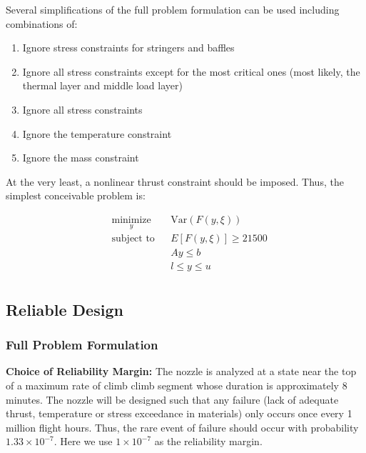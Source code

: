 \documentclass{article}
\begin{document}
Several simplifications of the full problem formulation can be used including combinations of:

\begin{enumerate}
\item Ignore stress constraints for stringers and baffles
\item Ignore all stress constraints except for the most critical ones (most likely, the thermal layer and middle load layer)
\item Ignore all stress constraints
\item Ignore the temperature constraint
\item Ignore the mass constraint
\end{enumerate}

At the very least, a nonlinear thrust constraint should be imposed. Thus, the simplest conceivable problem is:

\begin{equation}
\label{eq:simplest_robust_optim}
\begin{aligned}
& \underset{y}{\text{minimize}}
& & \textrm{Var} \left( F(y,\xi) \right) \\
& \text{subject to}
& & E \left[ F(y,\xi) \right] \geq 21500 \\
& & & Ay \leq b \\
& & & l \leq y \leq u \\
\end{aligned}
\end{equation}

\subsection{Reliable Design}

\subsubsection{Full Problem Formulation}

\begin{mdframed}
\textbf{Choice of Reliability Margin:}  
The nozzle is analyzed at a state near the top of a maximum rate of climb climb segment whose duration is approximately 8 minutes. The nozzle will be designed such that any failure (lack of adequate thrust, temperature or stress exceedance in materials) only occurs once every 1 million flight hours. Thus, the rare event of failure should occur with probability $1.33\times10^{-7}$. Here we use $1\times10^{-7}$ as the reliability margin.
\end{mdframed}
\end{document}
